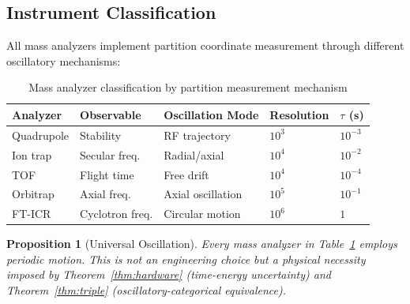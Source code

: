 \documentclass[twocolumn,10pt]{article}
\newtheorem{proposition}[theorem]{Proposition}
\begin{document}
\subsection{Instrument Classification}

All mass analyzers implement partition coordinate measurement through different oscillatory mechanisms:

\begin{table}[h]
\centering
\caption{Mass analyzer classification by partition measurement mechanism}
\label{tab:instruments}
\begin{tabular}{lllll}
\toprule
\textbf{Analyzer} & \textbf{Observable} & \textbf{Oscillation Mode} & \textbf{Resolution} & \textbf{$\tau$ (s)} \\
\midrule
Quadrupole & Stability & RF trajectory & $10^3$ & $10^{-3}$ \\
Ion trap & Secular freq. & Radial/axial & $10^4$ & $10^{-2}$ \\
TOF & Flight time & Free drift & $10^4$ & $10^{-4}$ \\
Orbitrap & Axial freq. & Axial oscillation & $10^5$ & $10^{-1}$ \\
FT-ICR & Cyclotron freq. & Circular motion & $10^6$ & $1$ \\
\bottomrule
\end{tabular}
\end{table}

\begin{proposition}[Universal Oscillation]
\label{prop:universal}
Every mass analyzer in Table~\ref{tab:instruments} employs periodic motion. This is not an engineering choice but a \emph{physical necessity} imposed by Theorem~\ref{thm:hardware} (time-energy uncertainty) and Theorem~\ref{thm:triple} (oscillatory-categorical equivalence).
\end{proposition}
\end{document}
